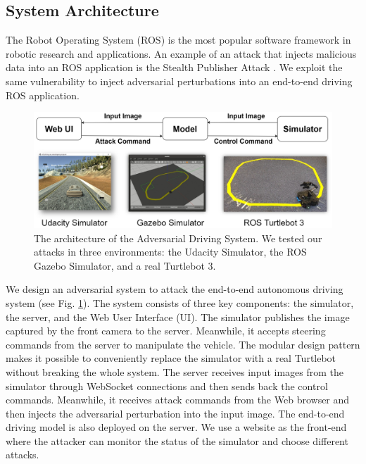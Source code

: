 \subsection{System Architecture}

The Robot Operating System (ROS) \citep{ros} is the most popular software framework in robotic research and applications. An example of an attack that injects malicious data into an ROS application is the Stealth Publisher Attack \citep{dieber2020penetration}. We exploit the same vulnerability to inject adversarial perturbations into an end-to-end driving ROS application.

\begin{figure}[H]
    \centering
    \includegraphics[width=\textwidth]{figures/chapter_driving/architechture.jpg}
    \caption{The architecture of the Adversarial Driving System. We tested our attacks in three environments: the Udacity Simulator, the ROS Gazebo Simulator, and a real Turtlebot 3.}
    \label{fig:arch}
\end{figure}

We design an adversarial system to attack the end-to-end autonomous driving system (see Fig. \ref{fig:arch}). The system consists of three key components: the simulator, the server, and the Web User Interface (UI). The simulator publishes the image captured by the front camera to the server. Meanwhile, it accepts steering commands from the server to manipulate the vehicle. The modular design pattern makes it possible to conveniently replace the simulator with a real Turtlebot without breaking the whole system. The server receives input images from the simulator through WebSocket connections and then sends back the control commands. Meanwhile, it receives attack commands from the Web browser and then injects the adversarial perturbation into the input image. The end-to-end driving model is also deployed on the server. We use a website as the front-end where the attacker can monitor the status of the simulator and choose different attacks.

